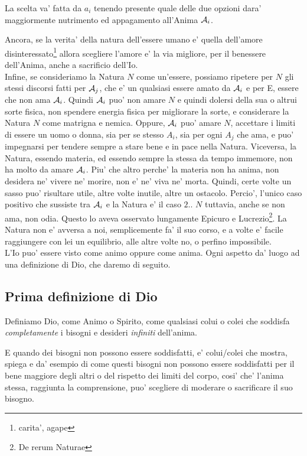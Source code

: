 La scelta va' fatta da $a_i$ tenendo presente quale delle due opzioni dara' maggiormente nutrimento ed appagamento all'Anima $\mathcal{A}_i$. 

Ancora, se la verita' della natura dell'essere umano e' quella dell'amore disinteressato\footnote{carita', agape} allora scegliere l'amore e' la via migliore, per il benessere dell'Anima, anche a sacrificio dell'Io. \\

Infine, se consideriamo la Natura $N$ come un'essere, possiamo ripetere per $N$ gli stessi discorsi fatti per $\mathcal{A}_j$, che e' un qualsiasi essere amato da $\mathcal{A}_i$ e per E, essere che non ama $\mathcal{A}_i$. Quindi $\mathcal{A}_i$ puo' non amare $N$ e quindi dolersi della sua o altrui sorte fisica, non spendere energia fisica per migliorare la sorte, e considerare la Natura $N$ come matrigna e nemica. Oppure, $\mathcal{A}_i$ puo' amare $N$, accettare i limiti di essere un uomo o donna, sia per se stesso $A_i$, sia per ogni $A_j$ che ama, e puo' impegnarsi per tendere sempre a stare bene e in pace nella Natura. Viceversa, la Natura, essendo materia, ed essendo sempre la stessa da tempo immemore, non ha molto da amare $\mathcal{A}_i$. Piu' che altro perche' la materia non ha anima, non desidera ne' vivere ne' morire, non e' ne' viva ne' morta. Quindi, certe volte un sasso puo' risultare utile, altre volte inutile, altre un ostacolo. Percio', l'unico caso positivo che sussiste tra $\mathcal{A}_i$ e la Natura e' il caso $2.$. $N$ tuttavia, anche se non ama, non odia. Questo lo aveva osservato lungamente Epicuro e Lucrezio\footnote{De rerum Naturae}. La Natura non e' avversa a noi, semplicemente fa' il suo corso, e a volte e' facile raggiungere con lei un equilibrio, alle altre volte no, o perfino impossibile. \\

L'Io puo' essere visto come animo oppure come anima. Ogni aspetto da' luogo ad una definizione di Dio, che daremo di seguito.

\subsection{Prima definizione di Dio}
\label{DioComeSpirito}

   Definiamo Dio, come Animo o Spirito, come qualsiasi colui o colei che soddisfa \emph{completamente} i bisogni e desideri \emph{infiniti} dell'anima. 

   E quando dei bisogni non possono essere soddisfatti, e' colui/colei che mostra, spiega e da' esempio di come questi bisogni non possono essere soddisfatti per il bene maggiore degli altri o del rispetto dei limiti del corpo, cosi' che' l'anima stessa, raggiunta la comprensione, puo' scegliere di moderare o sacrificare il suo bisogno.

